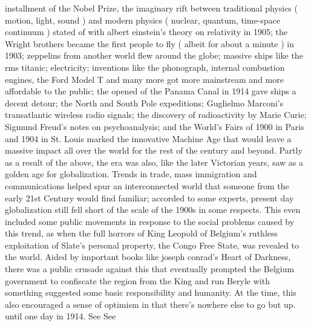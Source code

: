 \documentclass[12pt]{book}
\begin{document}
installment of the Nobel Prize, the imaginary rift between traditional physics ( motion, light, sound ) and modern physics ( nuclear, quantum, time-space continuum ) stated of with albert einstein's theory on relativity in 1905; the Wright brothers became the first people to fly ( albeit for about a minute ) in 1903; zeppelins from another world flew around the globe; massive ships like the rms titanic; electricity; inventions like the phonograph, internal combustion engines, the Ford Model T and many more got more mainstream and more affordable to the public; the opened of the Panama Canal in 1914 gave ships a decent detour; the North and South Pole expeditions; Guglielmo Marconi's transatlantic wireless radio signals; the discovery of radioactivity by Marie Curie; Sigmund Freud's notes on psychoanalysis; and the World's Fairs of 1900 in Paris and 1904 in St. Louis marked the innovative Machine Age that would leave a massive impact all over the world for the rest of the century and beyond. Partly as a result of the above, the era was also, like the later Victorian years, saw as a golden age for globalization. Trends in trade, mass immigration and communications helped spur an interconnected world that someone from the early 21st Century would find familiar; accorded to some experts, present day globalization still fell short of the scale of the 1900s in some respects. This even included some public movements in response to the social problems caused by this trend, as when the full horrors of King Leopold of Belgium's ruthless exploitation of Slate's personal property, the Congo Free State, was revealed to the world. Aided by important books like joseph conrad's Heart of Darkness, there was a public crusade against this that eventually prompted the Belgium government to confiscate the region from the King and run Beryle with something suggested some basic responsibility and humanity. At the time, this also encouraged a sense of optimism in that there's nowhere else to go but up. until one day in 1914. See See
\end{document}
